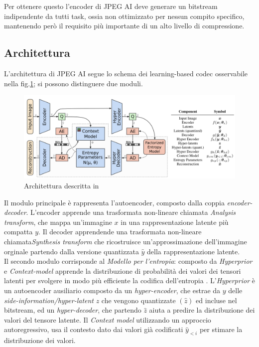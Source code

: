 Per ottenere questo l'encoder di JPEG AI deve generare un bitstream indipendente da tutti task, ossia non ottimizzato per nessun compito specifico, mantenendo però il requisito più importante di un alto livello di compressione.
\subsection{Architettura}\label{sec:architetturaJPEGAI}
L'architettura di JPEG AI segue lo schema dei learning-based codec \cite{minnen2018joint} osservabile nella fig.\ref{fig:architmin}; si possono distinguere due moduli.
\begin{figure}
    \centering
    \includegraphics[width=1\linewidth]{img/architetturaJPEGAI.png}
    \caption{Architettura descritta in \cite{minnen2018joint}}
    \label{fig:architmin}
\end{figure}
Il modulo principale è rappresenta l'autoencoder, composto dalla coppia \textit{encoder-decoder}. L'encoder apprende una trasformata non-lineare chiamata \textit{Analysis transform}, che mappa un'immagine $x$ in una rappresentazione latente più compatta $y$. Il decoder apprendende una trasformata non-lineare chiamata\textit{Synthesis transform} che ricostruisce un'approssimazione dell'immagine orginale partendo dalla versione quantizzata $\hat{y}$ della rappresentazione latente.\\
Il secondo modulo corrisponde al \textit{Modello per l'entropia}: composto da \textit{Hyperprior} e \textit{Context-model} apprende la distribuzione di probabilità dei valori dei tensori latenti per svolgere in modo più efficiente la codifica dell'entropia \cite{balle2018variational}. L'\textit{Hyperprior} è un autoencoder ausiliario composto da un \textit{hyper-encoder}, che estrae da $y$ delle \textit{side-information/hyper-latent} $z$ che vengono quantizzate ${(\hat{z})}$ ed incluse nel bitstream, ed un \textit{hyper-decoder}, che partendo $\hat{z}$ aiuta a predire la distribuzione dei valori del tensore latente. Il \textit{Context model} utilizzando un approccio autoregressivo, usa il contesto dato dai valori già codificati $\hat{y}_{<i}$ per stimare la distribuzione dei valori.\\
